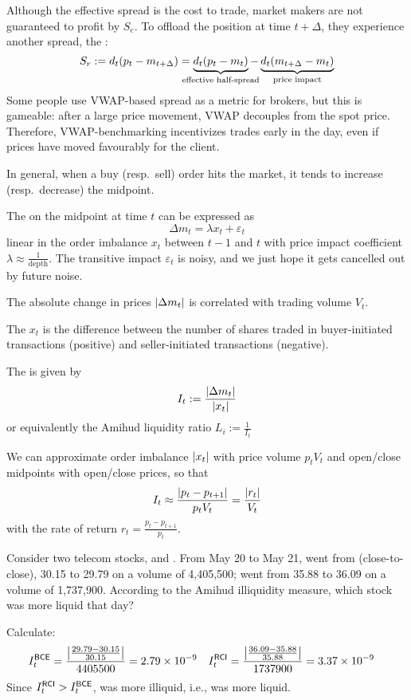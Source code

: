 \documentclass[class=bu430,notes,tikz]{agony}
\begin{document}
Although the effective spread is the cost to trade,
market makers are not guaranteed to profit by $S_e$.
To offload the position at time $t+\Delta$, they experience another spread,
the :
\[ S_r := d_t(p_t - m_{t+\Delta}) = \underbrace{d_t(p_t - m_t)}_{\mathclap{\text{effective half-spread}}} - \underbrace{d_t(m_{t+\Delta} - m_t)}_{\text{price impact}} \]
Some people use VWAP-based spread as a metric for brokers, but this is gameable:
after a large price movement, VWAP decouples from the spot price.
Therefore, VWAP-benchmarking incentivizes trades early in the day,
even if prices have moved favourably for the client.

In general, when a buy (resp.\ sell) order hits the market, it tends to
increase (resp.\ decrease) the midpoint.
\begin{lemma}
  The  on the midpoint at time $t$ can be expressed as
  \[ \Delta m_t = \lambda x_t + \varepsilon_t \]
  linear in the order imbalance $x_t$ between $t-1$ and $t$
  with price impact coefficient $\lambda \approx \frac{1}{\text{depth}}$.
  The transitive impact $\varepsilon_t$ is noisy,
  and we just hope it gets cancelled out by future noise.
\end{lemma}

The absolute change in prices $\abs{\Delta m_t}$ is correlated with trading volume $V_t$.
\begin{defn}
  The  $x_t$ is the difference between the number of shares
  traded in buyer-initiated transactions (positive)
  and seller-initiated transactions (negative).

  The  is given by
  \[ I_t := \frac{\abs{\Delta m_t}}{\abs{x_t}} \]
  or equivalently the Amihud liquidity ratio $L_i := \frac{1}{I_t}$
\end{defn}

\begin{lemma}
  We can approximate order imbalance $\abs{x_t}$ with price volume $p_t V_t$
  and open/close midpoints with open/close prices, so that
  \[ I_t \approx \frac{\abs{p_t-p_{t+1}}}{p_tV_t} = \frac{\abs{r_t}}{V_t} \]
  with the rate of return $r_t = \frac{p_t - p_{t+1}}{p_t}$.
\end{lemma}

\begin{example}
  Consider two telecom stocks,  and \@.
  From May 20 to May 21,  went from (close-to-close),
  30.15 to 29.79 on a volume of 4,405,500;  went from
  35.88 to 36.09 on a volume of 1,737,900. According to the Amihud illiquidity
  measure, which stock was more liquid that day?
\end{example}
\begin{sol}
  Calculate:
  \begin{align*}
    I_t^{\mathsf{BCE}} & = \frac{\abs{\frac{29.79-30.15}{30.15}}}{4405500} = 2.79\times 10^{-9} &
    I_t^{\mathsf{RCI}} & = \frac{\abs{\frac{36.09-35.88}{35.88}}}{1737900} = 3.37\times 10^{-9}
  \end{align*}
  Since $I_t^{\mathsf{RCI}} > I_t^{\mathsf{BCE}}$,  was more illiquid, i.e.,
   was more liquid.
\end{sol}
\end{document}
